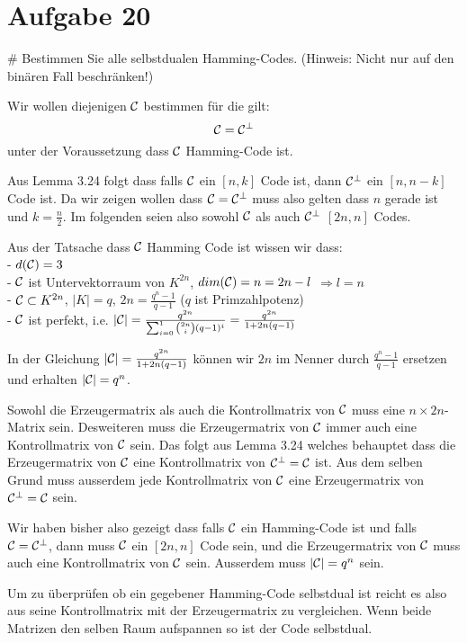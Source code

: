 \section*{Aufgabe 20}
\begin{myList}
#
Bestimmen Sie alle selbstdualen Hamming-Codes.
(Hinweis: Nicht nur auf den binären Fall beschränken!)\medskip

Wir wollen diejenigen $\mathcal{C}$ bestimmen für die gilt:
\begin{equation*}
	\mathcal{C} = \mathcal{C}^\bot
\end{equation*}
unter der Voraussetzung dass $\mathcal{C}$ Hamming-Code ist.\medskip

Aus Lemma 3.24 folgt dass falls $\mathcal{C}$ ein $[n,k]$ Code ist, dann $\mathcal{C}^\bot$ ein $[n,n-k]$ Code ist. Da wir zeigen wollen dass $\mathcal{C} = \mathcal{C}^\bot$ muss also gelten dass $n$ gerade ist und $k = \frac{n}{2}$.
Im folgenden seien also sowohl $\mathcal{C}$ als auch $\mathcal{C}^\bot$ $[2n, n]$ Codes.\medskip

Aus der Tatsache dass $\mathcal{C}$ Hamming Code ist wissen wir dass:\\
	- $d(\mathcal{C}) = 3$\\
	- $\mathcal{C}$ ist Untervektorraum von $K^{2n}$, $dim(\mathcal{C}) = n = 2n - l$ $\Rightarrow l = n$\\
	- $\mathcal{C} \subset K^{2n}$, $|K| = q$, $2n = \frac{q^n - 1}{q -1}$ ($q$ ist Primzahlpotenz)\\
	- $\mathcal{C}$ ist perfekt, i.e. $|\mathcal{C}| = \frac{q^{2n}}{\sum_{i=0}^1 \binom{2n}{i}(q -1)^i} =  \frac{q^{2n}}{ 1 + 2n(q -1)}$\medskip

In der Gleichung $|\mathcal{C}| = \frac{q^{2n}}{1 + 2n(q-1)}$ können wir $2n$ im Nenner durch $\frac{q^n -1}{q-1}$ ersetzen und erhalten $|\mathcal{C}| = q^n$.\medskip

Sowohl die Erzeugermatrix als auch die Kontrollmatrix von $\mathcal{C}$ muss eine $n \times 2n$-Matrix sein.
Desweiteren muss die Erzeugermatrix von $\mathcal{C}$ immer auch eine Kontrollmatrix von $\mathcal{C}$ sein.
Das folgt aus Lemma 3.24 welches behauptet dass die Erzeugermatrix von $\mathcal{C}$ eine Kontrollmatrix von $\mathcal{C}^\bot = \mathcal{C}$ ist. 
Aus dem selben Grund muss ausserdem jede Kontrollmatrix von $\mathcal{C}$ eine Erzeugermatrix von $\mathcal{C}^\bot = \mathcal{C}$ sein.\medskip

Wir haben bisher also gezeigt dass falls $\mathcal{C}$ ein Hamming-Code ist und falls $\mathcal{C} = \mathcal{C}^\bot$, dann muss $\mathcal{C}$ ein $[2n,n]$ Code sein, und die Erzeugermatrix von $\mathcal{C}$ muss auch eine Kontrollmatrix von $\mathcal{C}$ sein. Ausserdem muss $|\mathcal{C}| = q^n$ sein.\medskip

Um zu überprüfen ob ein gegebener Hamming-Code selbstdual ist reicht es also aus seine Kontrollmatrix mit der Erzeugermatrix zu vergleichen. Wenn beide Matrizen den selben Raum aufspannen so ist der Code selbstdual.


\end{myList}
